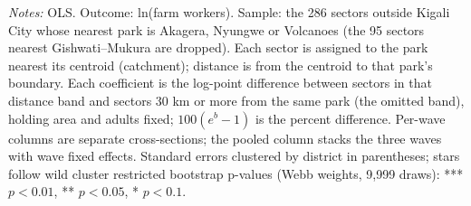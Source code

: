 \documentclass[11pt]{article}
\begin{document}
\begin{table}[H]
\begin{minipage}{0.97\textwidth}
\textit{Notes:} OLS. Outcome: ln(farm workers). Sample: the 286 sectors outside Kigali City whose nearest park is Akagera, Nyungwe or Volcanoes (the 95 sectors nearest Gishwati--Mukura are dropped). Each sector is assigned to the park nearest its centroid (catchment); distance is from the centroid to that park's boundary. Each coefficient is the log-point difference between sectors in that distance band and sectors 30 km or more from the same park (the omitted band), holding area and adults fixed; $100(e^{b}-1)$ is the percent difference. Per-wave columns are separate cross-sections; the pooled column stacks the three waves with wave fixed effects. Standard errors clustered by district in parentheses; stars follow wild cluster restricted bootstrap p-values (Webb weights, 9,999 draws): *** $p<0.01$, ** $p<0.05$, * $p<0.1$.
\end{minipage}
\end{table}
\clearpage
\end{document}
